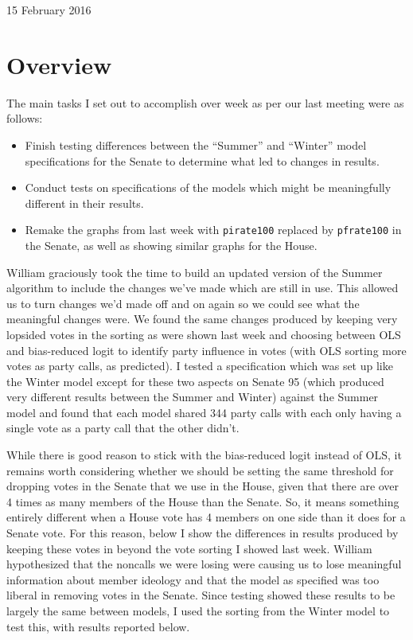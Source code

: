 \documentclass[12pt]{article}
\begin{document}
\begin{center}
\Large 15 February 2016
\end{center}

\section{Overview}

The main tasks I set out to accomplish over week as per our last meeting were as follows:

\begin{itemize}
	\item Finish testing differences between the ``Summer'' and ``Winter'' model specifications for the Senate to determine what led to changes in results.
	
	\item Conduct tests on specifications of the models which might be meaningfully different in their results.
	
	\item Remake the graphs from last week with \verb|pirate100| replaced by \verb|pfrate100| in the Senate, as well as showing similar graphs for the House.
\end{itemize}

\noindent
William graciously took the time to build an updated version of the Summer algorithm to include the changes we've made which are still in use. This allowed us to turn changes we'd made off and on again so we could see what the meaningful changes were. We found the same changes produced by keeping very lopsided votes in the sorting as were shown last week and choosing between OLS and bias-reduced logit to identify party influence in votes (with OLS sorting more votes as party calls, as predicted). I tested a specification which was set up like the Winter model except for these two aspects on Senate 95 (which produced very different results between the Summer and Winter) against the Summer model and found that each model shared 344 party calls with each only having a single vote as a party call that the other didn't.

While there is good reason to stick with the bias-reduced logit instead of OLS, it remains worth considering whether we should be setting the same threshold for dropping votes in the Senate that we use in the House, given that there are over 4 times as many members of the House than the Senate. So, it means something entirely different when a House vote has 4 members on one side than it does for a Senate vote. For this reason, below I show the differences in results produced by keeping these votes in beyond the vote sorting I showed last week. William hypothesized that the noncalls we were losing were causing us to lose meaningful information about member ideology and that the model as specified was too liberal in removing votes in the Senate. Since testing showed these results to be largely the same between models, I used the sorting from the Winter model to test this, with results reported below. 
\end{document}
